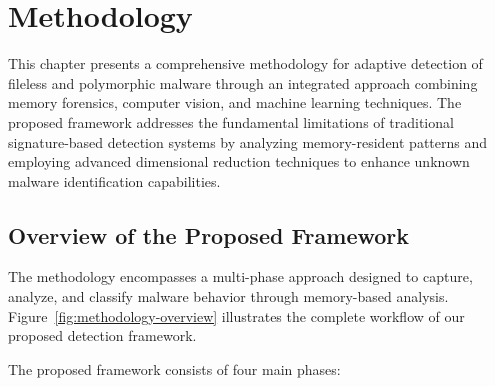 \chapter{Methodology}
\label{ch:methodology}

This chapter presents a comprehensive methodology for adaptive detection of fileless and polymorphic malware through an integrated approach combining memory forensics, computer vision, and machine learning techniques. The proposed framework addresses the fundamental limitations of traditional signature-based detection systems by analyzing memory-resident patterns and employing advanced dimensional reduction techniques to enhance unknown malware identification capabilities.

\section{Overview of the Proposed Framework}
\label{sec:methodology-overview}

The methodology encompasses a multi-phase approach designed to capture, analyze, and classify malware behavior through memory-based analysis. Figure~\ref{fig:methodology-overview} illustrates the complete workflow of our proposed detection framework.


The proposed framework consists of four main phases:

